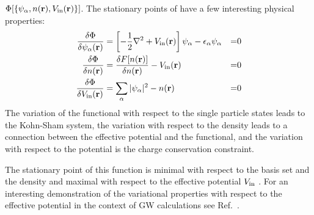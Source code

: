 $\Phi[\{\psi_{\alpha},n({\bf r}),V_{\rm in}({\bf r}) \}]$. The stationary points of
have a few interesting physical properties:
%
\begin{align}
 \frac{\delta \Phi}{\delta \psi_{\alpha}({\bf r})} & = \left[-\frac{1}{2}\nabla^{2} + V_{\rm in}({\bf r}) \right]\psi_{\alpha} -\epsilon_{\alpha}\psi_{\alpha}  &=& 0 \\
 \frac{\delta \Phi}{\delta n({\bf r})}  & =  \frac{\delta F[n({\bf r})]}{\delta n({\bf r})} - V_{\rm in}({\bf r}) &=& 0 \\
 \frac{\delta \Phi}{\delta V_{\rm in}({\bf r})} & = \sum_{\alpha}|\psi_{\alpha}|^{2} - n({\bf r}) &=& 0
\end{align}
%
The variation of the functional with respect to the single particle states leads to the Kohn-Sham system,
the variation with respect to the density leads to a connection between the effective potential and the functional,
and the variation with respect to the potential is the charge conservation constraint.

The stationary point of this function is minimal with respect to the basis set and
the density and maximal with respect to the effective potential $V_{\rm in}$ \cite{methfessel95}.
For an interesting demonstration of the variational properties with respect to the 
effective potential in the context of GW calculations see Ref.~\cite{sohrab10}.


